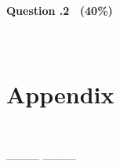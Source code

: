 \documentclass[12pt,fleqn,a4paper]{article}
\begin{document}
        \

        \begin{verbatim}
		    
        \end{verbatim}
    
        
    
        \newpage
        

        \paragraph{\textbf{Question \thesection.2 \ (40\%)}}
        \begin{verbatim}
		     
        \end{verbatim}

    
    \newpage
    \section*{Appendix}

        \begin{verbatim}
            
        \end{verbatim}




    \begin{center}
    \vfill
    --------- \textit{\lastwords} ---------
    \label{finalpage}
    \end{center}
\end{document}
